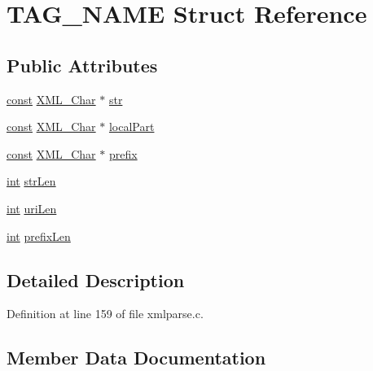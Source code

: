 \hypertarget{struct_t_a_g___n_a_m_e}{}\section{T\+A\+G\+\_\+\+N\+A\+ME Struct Reference}
\label{struct_t_a_g___n_a_m_e}
\subsection*{Public Attributes}
\begin{DoxyCompactItemize}
\item 
\hyperlink{getopt1_8c_a2c212835823e3c54a8ab6d95c652660e}{const} \hyperlink{amiga_2include_2libraries_2expat_8h_a63da96463e775e1ec3a7d1f076208127}{X\+M\+L\+\_\+\+Char} $\ast$ \hyperlink{struct_t_a_g___n_a_m_e_a99c105fe5bfd6a95e0640182522f5d3c}{str}
\item 
\hyperlink{getopt1_8c_a2c212835823e3c54a8ab6d95c652660e}{const} \hyperlink{amiga_2include_2libraries_2expat_8h_a63da96463e775e1ec3a7d1f076208127}{X\+M\+L\+\_\+\+Char} $\ast$ \hyperlink{struct_t_a_g___n_a_m_e_a92bf2e39dc1e8b44f7fd5dcf8d8567c2}{local\+Part}
\item 
\hyperlink{getopt1_8c_a2c212835823e3c54a8ab6d95c652660e}{const} \hyperlink{amiga_2include_2libraries_2expat_8h_a63da96463e775e1ec3a7d1f076208127}{X\+M\+L\+\_\+\+Char} $\ast$ \hyperlink{struct_t_a_g___n_a_m_e_ae2f03597abbab572e43df491d91b95d0}{prefix}
\item 
\hyperlink{xmltok_8h_a5a0d4a5641ce434f1d23533f2b2e6653}{int} \hyperlink{struct_t_a_g___n_a_m_e_a744e3db439c6031240b5d857111e6c4e}{str\+Len}
\item 
\hyperlink{xmltok_8h_a5a0d4a5641ce434f1d23533f2b2e6653}{int} \hyperlink{struct_t_a_g___n_a_m_e_ae5bffa95a259b280dca1ddd9f69819bd}{uri\+Len}
\item 
\hyperlink{xmltok_8h_a5a0d4a5641ce434f1d23533f2b2e6653}{int} \hyperlink{struct_t_a_g___n_a_m_e_a682989d51ef2a858da71ff3051377264}{prefix\+Len}
\end{DoxyCompactItemize}


\subsection{Detailed Description}


Definition at line 159 of file xmlparse.\+c.



\subsection{Member Data Documentation}
